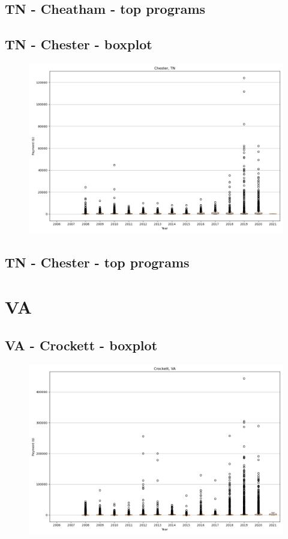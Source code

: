 \subsection*{TN - Cheatham - top programs}

\newpage
\subsection*{TN - Chester - boxplot}
\begin{figure}[h]
\centering
\includegraphics[width=7in]{../output/boxplots/counties/Chester-TN_boxplot.png}
\end{figure}


\subsection*{TN - Chester - top programs}

\newpage
\section*{VA}
\subsection*{VA - Crockett - boxplot}
\begin{figure}[h]
\centering
\includegraphics[width=7in]{../output/boxplots/counties/Crockett-VA_boxplot.png}
\end{figure}



